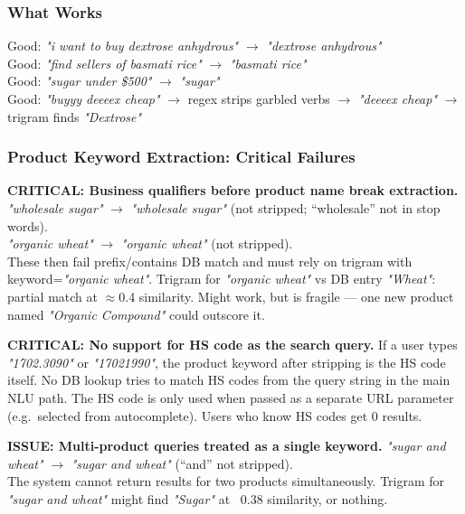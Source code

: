 \documentclass[12pt,a4paper]{article}
\begin{document}
\subsubsection{What Works}

\begin{okBox}
Good: \textit{"i want to buy dextrose anhydrous"} $\rightarrow$ \textit{"dextrose anhydrous"} \\
Good: \textit{"find sellers of basmati rice"} $\rightarrow$ \textit{"basmati rice"} \\
Good: \textit{"sugar under \$500"} $\rightarrow$ \textit{"sugar"} \\
Good: \textit{"buyyy deeeex cheap"} $\rightarrow$ regex strips garbled verbs $\rightarrow$ \textit{"deeeex cheap"} $\rightarrow$ trigram finds \textit{"Dextrose"}
\end{okBox}

\subsubsection{Product Keyword Extraction: Critical Failures}

\begin{issueBox}
\textbf{CRITICAL: Business qualifiers before product name break extraction.}
\textit{"wholesale sugar"} $\rightarrow$ \textit{"wholesale sugar"} (not stripped; ``wholesale'' not in stop words). \\
\textit{"organic wheat"} $\rightarrow$ \textit{"organic wheat"} (not stripped). \\
These then fail prefix/contains DB match and must rely on trigram with keyword=\textit{"organic wheat"}.
Trigram for \textit{"organic wheat"} vs DB entry \textit{"Wheat"}: partial match at $\approx$0.4 similarity. Might work,
but is fragile --- one new product named \textit{"Organic Compound"} could outscore it.
\end{issueBox}

\begin{issueBox}
\textbf{CRITICAL: No support for HS code as the search query.}
If a user types \textit{"1702.3090"} or \textit{"17021990"}, the product keyword after
stripping is the HS code itself. No DB lookup tries to match HS codes from the query
string in the main NLU path. The HS code is only used when passed as a separate URL
parameter (e.g.\ selected from autocomplete). Users who know HS codes get 0 results.
\end{issueBox}

\begin{issueBox}
\textbf{ISSUE: Multi-product queries treated as a single keyword.}
\textit{"sugar and wheat"} $\rightarrow$ \textit{"sugar and wheat"} (``and'' not stripped). \\
The system cannot return results for two products simultaneously.
Trigram for \textit{"sugar and wheat"} might find \textit{"Sugar"} at ~0.38 similarity, or nothing.
\end{issueBox}
\end{document}
